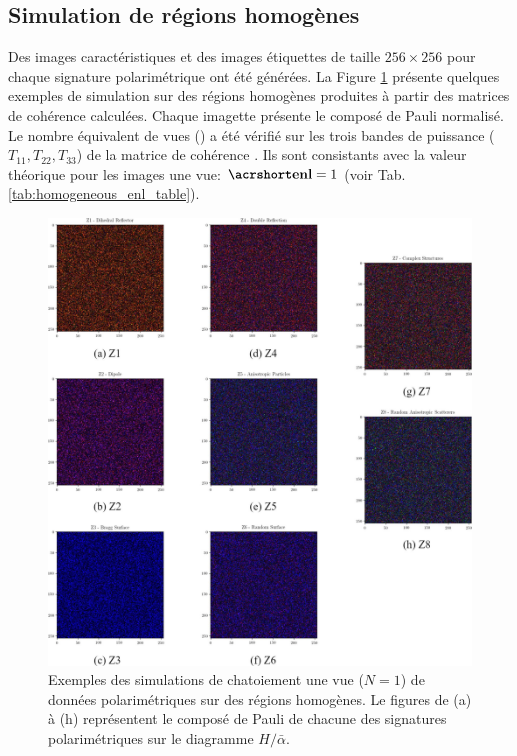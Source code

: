 \haalphasigs

\subsection{Simulation de régions homogènes} \label{sec:simulation_de_region_homomgene}

Des images caractéristiques et des images étiquettes de taille $256\times256$ pour chaque signature polarimétrique ont été générées.  La Figure \ref{fig:shomogeneous_polarimetric_signatures} présente quelques exemples de simulation sur des régions homogènes produites à partir des matrices de cohérence calculées.  Chaque imagette présente le composé de Pauli normalisé.   Le nombre équivalent de vues (\acrenl) a été vérifié sur les trois bandes de puissance ($T_{11}, T_{22}, T_{33}$) de la matrice de cohérence \matcoh.  Ils sont consistants avec la valeur théorique pour les images une vue: $\acrenl=1$ (voir Tab. \ref{tab:homogeneous_enl_table}).

\begin{figure}
  \includegraphics[width=1.1\linewidth]{figures/Chap3/homogeneous_polarimetric_signatures.jpg}
  \centering
  \caption{
  \small{Exemples des simulations de chatoiement une vue ($N=1$) de données polarimétriques sur des régions homogènes.  Le figures de (a) à (h) représentent le composé de Pauli de chacune des signatures polarimétriques sur le diagramme $H/\bar{\alpha}$. }
  }
  \label{fig:shomogeneous_polarimetric_signatures}
\end{figure}




